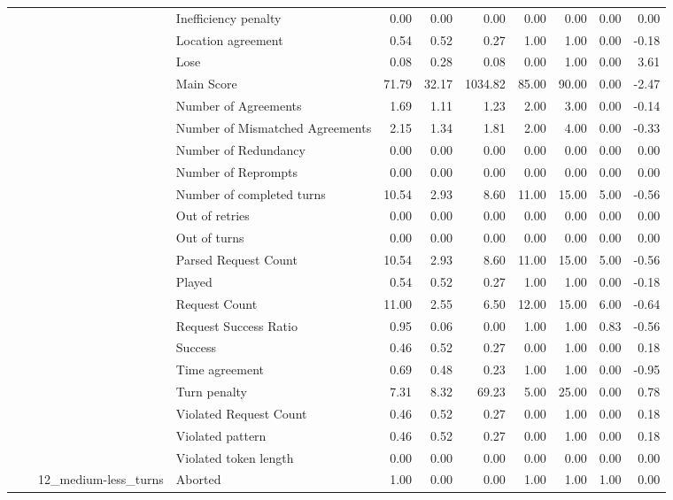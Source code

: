 \begin{tabular}{llllrrrrrrr}
 &  &  & Inefficiency penalty & 0.00 & 0.00 & 0.00 & 0.00 & 0.00 & 0.00 & 0.00 \\
 &  &  & Location agreement & 0.54 & 0.52 & 0.27 & 1.00 & 1.00 & 0.00 & -0.18 \\
 &  &  & Lose & 0.08 & 0.28 & 0.08 & 0.00 & 1.00 & 0.00 & 3.61 \\
 &  &  & Main Score & 71.79 & 32.17 & 1034.82 & 85.00 & 90.00 & 0.00 & -2.47 \\
 &  &  & Number of Agreements & 1.69 & 1.11 & 1.23 & 2.00 & 3.00 & 0.00 & -0.14 \\
 &  &  & Number of Mismatched Agreements & 2.15 & 1.34 & 1.81 & 2.00 & 4.00 & 0.00 & -0.33 \\
 &  &  & Number of Redundancy & 0.00 & 0.00 & 0.00 & 0.00 & 0.00 & 0.00 & 0.00 \\
 &  &  & Number of Reprompts & 0.00 & 0.00 & 0.00 & 0.00 & 0.00 & 0.00 & 0.00 \\
 &  &  & Number of completed turns & 10.54 & 2.93 & 8.60 & 11.00 & 15.00 & 5.00 & -0.56 \\
 &  &  & Out of retries & 0.00 & 0.00 & 0.00 & 0.00 & 0.00 & 0.00 & 0.00 \\
 &  &  & Out of turns & 0.00 & 0.00 & 0.00 & 0.00 & 0.00 & 0.00 & 0.00 \\
 &  &  & Parsed Request Count & 10.54 & 2.93 & 8.60 & 11.00 & 15.00 & 5.00 & -0.56 \\
 &  &  & Played & 0.54 & 0.52 & 0.27 & 1.00 & 1.00 & 0.00 & -0.18 \\
 &  &  & Request Count & 11.00 & 2.55 & 6.50 & 12.00 & 15.00 & 6.00 & -0.64 \\
 &  &  & Request Success Ratio & 0.95 & 0.06 & 0.00 & 1.00 & 1.00 & 0.83 & -0.56 \\
 &  &  & Success & 0.46 & 0.52 & 0.27 & 0.00 & 1.00 & 0.00 & 0.18 \\
 &  &  & Time agreement & 0.69 & 0.48 & 0.23 & 1.00 & 1.00 & 0.00 & -0.95 \\
 &  &  & Turn penalty & 7.31 & 8.32 & 69.23 & 5.00 & 25.00 & 0.00 & 0.78 \\
 &  &  & Violated Request Count & 0.46 & 0.52 & 0.27 & 0.00 & 1.00 & 0.00 & 0.18 \\
 &  &  & Violated pattern & 0.46 & 0.52 & 0.27 & 0.00 & 1.00 & 0.00 & 0.18 \\
 &  &  & Violated token length & 0.00 & 0.00 & 0.00 & 0.00 & 0.00 & 0.00 & 0.00 \\
\cline{3-11}
 &  & \multirow[t]{27}{*}{12_medium-less_turns} & Aborted & 1.00 & 0.00 & 0.00 & 1.00 & 1.00 & 1.00 & 0.00 \\

\end{tabular}

